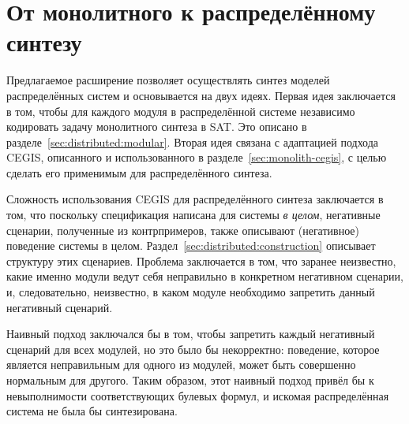 


\section{От монолитного к распределённому синтезу}
\label{sec:distributed}

Предлагаемое расширение позволяет осуществлять синтез моделей распределённых систем и основывается на двух идеях.
Первая идея заключается в том, чтобы для каждого модуля в распределённой системе независимо кодировать задачу монолитного синтеза в SAT.
Это описано в разделе~\ref{sec:distributed:modular}.
Вторая идея связана с адаптацией подхода CEGIS, описанного и использованного в разделе~\ref{sec:monolith-cegis}, с целью сделать его применимым для распределённого синтеза.

Сложность использования CEGIS для распределённого синтеза заключается в том, что поскольку спецификация написана для системы \emph{в целом}, негативные сценарии, полученные из контрпримеров, также описывают (негативное) поведение системы в целом.
Раздел~\ref{sec:distributed:construction} описывает структуру этих сценариев.
Проблема заключается в том, что заранее неизвестно, какие именно модули ведут себя неправильно в конкретном негативном сценарии, и, следовательно, неизвестно, в каком модуле необходимо запретить данный негативный сценарий.

Наивный подход заключался бы в том, чтобы запретить каждый негативный сценарий для всех модулей, но это было бы некорректно: поведение, которое является неправильным для одного из модулей, может быть совершенно нормальным для другого.
Таким образом, этот наивный подход привёл бы к невыполнимости соответствующих булевых формул, и искомая распределённая система не была бы синтезирована.

